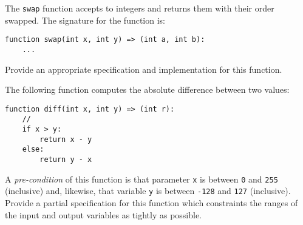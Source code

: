 \begin{ex}
The \lstinline{swap} function accepts to integers and returns them
with their order swapped.  The signature for the function is:
\begin{lstlisting}
function swap(int x, int y) => (int a, int b):
    ...
\end{lstlisting}
Provide an appropriate specification and implementation for this function.
\end{ex}


\begin{ex}
  The following function computes the absolute difference between two values:

\begin{lstlisting}
function diff(int x, int y) => (int r):
    //
    if x > y:
        return x - y
    else:
        return y - x
\end{lstlisting}

A {\em pre-condition} of this function is that parameter \lstinline{x}
is between \lstinline{0} and \lstinline{255} (inclusive) and,
likewise, that variable \lstinline{y} is between \lstinline{-128} and
\lstinline{127} (inclusive).  Provide a partial specification for
this function which constraints the ranges of the input and output
variables as tightly as possible.
\end{ex}

